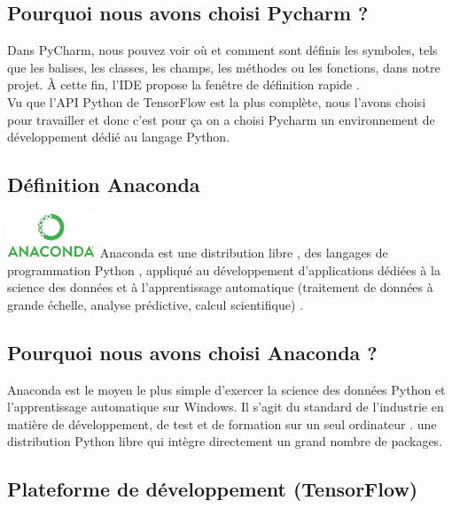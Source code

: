 \documentclass[12pt]{report}
\begin{document}
\subsection{Pourquoi nous avons choisi Pycharm ? }
Dans PyCharm, nous pouvez voir où et comment sont définis les symboles, tels que les balises, les classes, les champs, les méthodes ou les fonctions, dans notre projet. À cette fin, l'IDE propose la fenêtre de définition rapide  \cite{ref32}.\\
Vu que l’API Python de TensorFlow est la plus complète, nous l'avons choisi pour travailler et donc c’est pour ça on a choisi Pycharm un environnement de développement dédié au langage Python.
\subsection{Définition Anaconda  }
\begin{multicols}
\includegraphics[width=100]{anaconda.png}
Anaconda est une distribution libre , des langages de programmation Python , appliqué au développement d'applications dédiées à la science des données et à l'apprentissage automatique (traitement de données à grande échelle, analyse prédictive, calcul scientifique)  \cite{ref34}.
\end{multicols}
\subsection{Pourquoi nous avons choisi Anaconda ? }
Anaconda est le moyen le plus simple d'exercer la science des données Python et l'apprentissage automatique sur Windows. Il s'agit du standard de l'industrie en matière de développement, de test et de formation sur un seul ordinateur  \cite{ref35}.
une distribution Python libre qui intègre directement un grand nombre de packages.
\subsection{Plateforme de développement (TensorFlow) }
\end{document}
